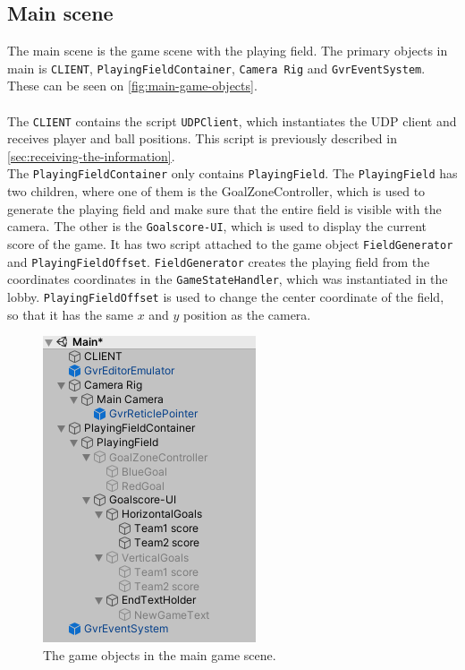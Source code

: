 \subsection{Main scene}
The main scene is the game scene with the playing field.
The primary objects in main is \texttt{CLIENT}, \texttt{PlayingFieldContainer}, \texttt{Camera Rig} and \texttt{GvrEventSystem}.
These can be seen on \autoref{fig:main-game-objects}.
\\\\
The \texttt{CLIENT} contains the script \texttt{UDPClient}, which instantiates the UDP client and receives player and ball positions.
This script is previously described in \autoref{sec:receiving-the-information}.
\\
The \texttt{PlayingFieldContainer} only contains \texttt{PlayingField}.
The \texttt{PlayingField} has two children, where one of them is the GoalZoneController, which is used to generate the playing field and make sure that the entire field is visible with the camera.
The other is the \texttt{Goalscore-UI}, which is used to display the current score of the game.
It has two script attached to the game object \texttt{FieldGenerator} and \texttt{PlayingFieldOffset}.
\texttt{FieldGenerator} creates the playing field from the coordinates coordinates in the \texttt{GameStateHandler}, which was instantiated in the lobby.
\texttt{PlayingFieldOffset} is used to change the center coordinate of the field, so that it has the same $x$ and $y$ position as the camera.



\begin{figure}[H]
    \centering
    \includegraphics[width=0.4\linewidth]{figures/unity-main-gameobjects.PNG}
    \caption{The game objects in the main game scene.}
    \label{fig:main-game-objects}
\end{figure}

